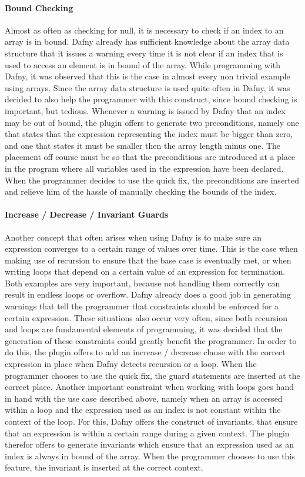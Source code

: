 \paragraph{Bound Checking}
Almost as often as checking for null, it is necessary to check if an index to an array is in bound. Dafny already has sufficient knowledge about the array data structure that it issues a warning every time it is not clear if an index that is used to access an element is in bound of the array. While programming with Dafny, it was observed that this is the case in almost every non trivial example using arrays. Since the array data structure is used quite often in Dafny, it was decided to also help the programmer with this construct, since bound checking is important, but tedious. \newline
Whenever a warning is issued by Dafny that an index may be out of bound, the plugin offers to generate two preconditions, namely one that states that the expression representing the index must be bigger than zero, and one that states it must be smaller then the array length minus one. The placement off course must be so that the preconditions are introduced at a place in the program where all variables used in the expression have been declared. When the programmer decides to use the quick fix, the preconditions are inserted and relieve him of the hassle of manually checking the bounds of the index.
\paragraph{Increase / Decrease / Invariant Guards}
Another concept that often arises when using Dafny is to make sure an expression converges to a certain range of values over time. This is the case when making use of recursion to ensure that the base case is eventually met, or when writing loops that depend on a certain value of an expression for termination. Both examples are very important, because not handling them correctly can result in endless loops or overflow. Dafny already does a good job in generating warnings that tell the programmer that constraints should be enforced for a certain expression. \newline
These situations also occur very often, since both recursion and loops are fundamental elements of programming, it was decided that the generation of these constraints could greatly benefit the programmer. In order to do this, the plugin offers to add an increase / decrease clause with the correct expression in place when Dafny detects recursion or a loop. When the programmer chooses to use the quick fix, the guard statements are inserted at the correct place. Another important constraint when working with loops goes hand in hand with the use case described above, namely when an array is accessed within a loop and the expression used as an index is not constant within the context of the loop. For this, Dafny offers the construct of invariants, that ensure that an expression is within a certain range during a given context. The plugin therefor offers to generate invariants which ensure that an expression used as an index is always in bound of the array. When the programmer chooses to use this feature, the invariant is inserted at the correct context. 

